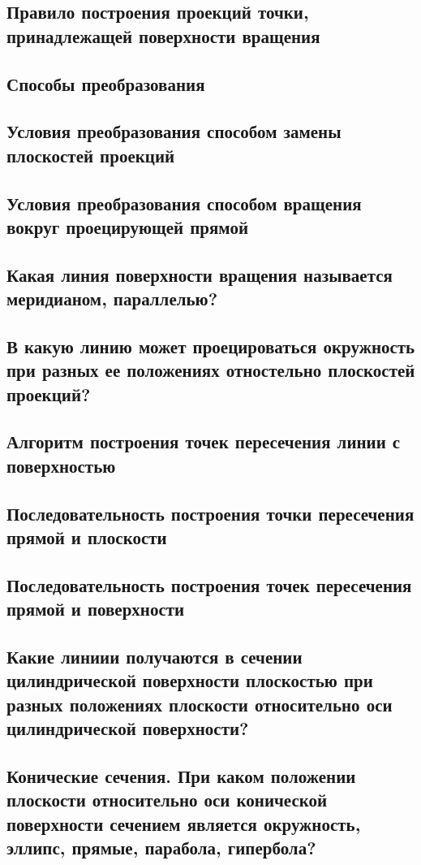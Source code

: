 \documentclass[a4paper, 10pt]{article}
\begin{document}
\subsection{Правило построения проекций точки, принадлежащей поверхности вращения}
\subsection{Способы преобразования}
\subsection{Условия преобразования способом замены плоскостей проекций}
\subsection{Условия преобразования способом вращения вокруг проецирующей прямой}
\subsection{Какая линия поверхности вращения называется меридианом, параллелью?}
\subsection{В какую линию может проецироваться окружность при разных ее положениях отностельно плоскостей проекций?}
\subsection{Алгоритм построения точек пересечения линии с поверхностью}
\subsection{Последовательность построения точки пересечения прямой и плоскости}
\subsection{Последовательность построения точек пересечения прямой и поверхности}
\subsection{Какие линиии получаются в сечении цилиндрической поверхности плоскостью при разных положениях плоскости относительно оси цилиндрической поверхности?}
\subsection{Конические сечения. При каком положении плоскости относительно оси конической поверхности сечением является окружность, эллипс, прямые, парабола, гипербола?}
\end{document}
